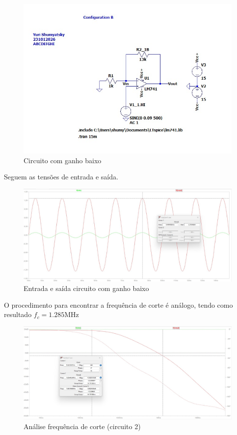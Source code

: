 \documentclass[10pt,twocolumn,letterpaper]{article}
\begin{document}
\begin{figure}[h]
\caption{Circuito com ganho baixo}
\begin{center}
\includegraphics[scale=0.25]{figuras/fig6}
\end{center}
\end{figure}

Seguem as tensões de entrada e saída.

\begin{figure}[h]
\caption{Entrada e saída circuito com ganho baixo}
\begin{center}
\includegraphics[scale=0.15]{figuras/fig7}
\end{center}
\end{figure}


O procedimento para encontrar a frequência de corte é análogo, tendo como resultado $f_c= 1.285$MHz

\begin{figure}[h]
\caption{Análise frequência de corte (circuito 2)}
\begin{center}
\includegraphics[scale=0.15]{figuras/fig8}
\end{center}
\end{figure}
\end{document}
